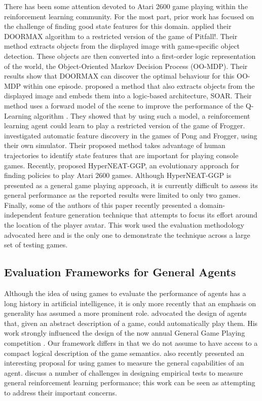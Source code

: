 \documentclass[twoside,11pt]{article}
\newcommand{\gamename}[1]{{\sc #1}}
\begin{document}
There has been some attention devoted to Atari 2600 game playing within the reinforcement learning community.
For the most part, prior work has focused on the challenge of finding good state features for this domain. 
 applied their DOORMAX algorithm to a restricted version of the game of \gamename{Pitfall!}.
Their method extracts objects from the displayed image with game-specific object detection. 
These objects are then converted into a first-order logic representation of the world, the Object-Oriented Markov Decision Process (OO-MDP). 
Their results show that DOORMAX can discover the optimal behaviour for this OO-MDP within one episode.
 proposed a method that also extracts objects from the displayed image and embeds them into a logic-based architecture, SOAR. 
Their method uses a forward model of the scene to improve the performance of the Q-Learning algorithm \cite{watkins1992}. 
They showed that by using such a model, a reinforcement learning agent could learn to play a restricted version of the game of \gamename{Frogger}.
 investigated automatic feature discovery in the games of \gamename{Pong} and \gamename{Frogger}, using their own simulator. 
Their proposed method takes advantage of human trajectories to identify state features that are important for playing console games. 
Recently,  proposed HyperNEAT-GGP, an evolutionary approach for finding policies to play Atari 2600 games. 
Although HyperNEAT-GGP is presented as a general game playing approach, it is currently difficult to assess its general performance as the reported results were limited to only two games. 
Finally, some of the authors of this paper \cite{bellemare2012} recently presented a domain-independent feature generation technique that attempts to focus its effort around the location of the player avatar.
This work used the evaluation methodology advocated here and is the only one to demonstrate the technique across a large set of testing games.

\subsection{Evaluation Frameworks for General Agents}

Although the idea of using games to evaluate the performance of agents has a long history in artificial intelligence, it is only more recently that an emphasis on generality has assumed a more prominent role.
 advocated the design of agents that, given an abstract description of a game, could automatically play them.
His work strongly influenced the design of the now annual General Game Playing competition \cite{ggpcomp}.
Our framework differs in that we do not assume to have access to a compact logical description of the game semantics.
 also recently presented an interesting proposal for using games to measure the general capabilities of an agent.
 discuss a number of challenges in designing empirical tests to measure general reinforcement learning performance; this work can be seen as attempting to address their important concerns.
\end{document}
